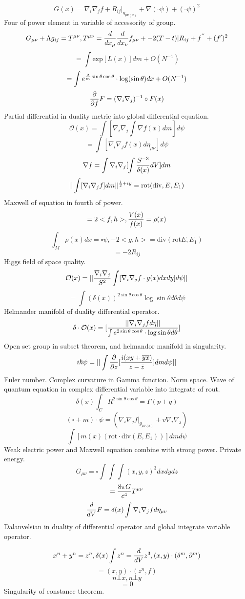 \documentclass{jsarticle}
\begin{document}
$$ G(x) = \nabla_{i}\nabla_{j} f + R_{ij}|_{g_{\mu\nu(x)}} + \nabla(\square \psi) + (\square \psi)^2 $$
Four of power element in variable of accessority of group.
$$ G_{\mu\nu} + \Lambda g_{ij} = T^{\mu\nu}, T^{\mu\nu} = {d \over dx_{\mu}}{d \over dx_{\nu}}f_{\mu\nu} +
-2(T - t)|R_{ij} + f^{''} + (f')^2 $$
	$$ = \int \mathrm{exp}[L(x)]dm + O(N^{-1}) $$
	$$ = \int e^{{2 \over m}\sin \theta \cos \theta}\cdot \log(\sin \theta)dx + O(N^{-1}) $$
	$$ {\partial \over \partial f}F = (\nabla_{i}\nabla_{j})^{-1} \circ F(x) $$
	Partial differential in duality metric into global differential equation.
	$$ \mathcal{O}(x) = \int[\nabla_{i}\nabla_{j}\int \nabla f(x) dm]d \psi $$
	$$ = \int[\nabla_{i}\nabla_{j}f(x) d\eta_{\mu\nu}]d\psi $$
	$$ \nabla f = \int {\nabla_{i}\nabla_{j}[\int {S^{-3} \over \delta(x)}dV]}dm $$
	$$ ||\int [\nabla_{i}\nabla_{j}f]dm||^{{1 \over 2} + iy} = \mathrm{rot}(\mathrm{div},E,E_1) $$
	Maxwell of equation in fourth of power.
	$$ = 2 <f,h>, {V(x) \over f(x)} = \rho (x) $$
	$$ \int_M \rho (x)dx = \square \psi, - 2 <g, h> = \mathrm{div}(\mathrm{rot} E,E_1) $$
	$$ = - 2 R_{ij} $$
	Higgs field of space quality.
	$$ \mathcal{O}(x) = ||{\nabla_{i}\nabla_{j} \over S^2}\int [\nabla_{i}\nabla_{j}f\cdot g(x)dxdy]d\psi|| $$
	$$ = \int (\delta(x))^{2 \sin \theta \cos \theta} \log \sin \theta d \theta d\psi $$
	Helmander manifold of duality differential operator.
	$$ \delta \cdot \mathcal{O}(x) = [{||\nabla_{i}\nabla_{j} f d \eta|| \over 
	\int e^{2 \sin \theta \cos \theta} \cdot \log \sin \theta d \theta}] $$	
	Open set group in subset theorem, and helmandor manifold in singularity.
	$$ i\hbar \psi = ||\int {\partial \over \partial z} [{i(xy + \overline{yx}) \over z - \bar{z}}]dmd\psi|| $$
	Euler number. Complex curvature in Gamma function. Norm space.
	Wave of quantum equation in complex differential variable into integrate of rout.
	$$ \delta(x) \int_C R^{2 \sin \theta \cos \theta} = \Gamma(p + q) $$
	$$ (\square + m) \cdot \psi = (\nabla_{i}\nabla_{j}f|_{g_{\mu\nu(x)}} + v \nabla_{i}\nabla_{j}) $$
	$$ \int[m(x)(\mathrm{rot}\cdot\mathrm{div}(E,E_1))]dmd\psi $$
	Weak electric power and Maxwell equation combine with strong power.
	Private energy.
	$$ G_{\mu\nu} = \square \int \int \int (x,y,z)^3dxdydz $$
	$$ = {8 \pi G \over c^4}T^{\mu\nu} $$
	$$ {d \over dV}F = \delta(x) \int \nabla_{i}\nabla_{j}f d \eta_{\mu\nu} $$
	Dalanvelsian in duality of differential operator and global integrate variable operator.

	$$ x^n + y^n = z^n, \delta (x) \int z^n = {d \over dV}z^3, (x,y)\cdot(\delta^m,\partial^m) $$
	$$ = (x,y)\cdot(z^n,f) $$
	$$ n \bot x, n \bot y $$
	$$ = 0 $$
	Singularity of constance theorem.
\end{document}
